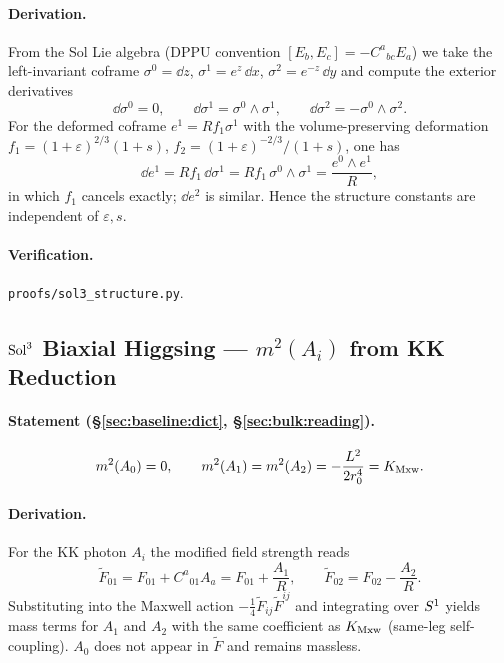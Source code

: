 \paragraph{Derivation.}
From the Sol Lie algebra (DPPU convention $[E_b, E_c] = -C^a{}_{bc} E_a$) we
take the left-invariant coframe
$\sigma^0 = \dd z$, $\sigma^1 = e^z\,\dd x$, $\sigma^2 = e^{-z}\,\dd y$ and
compute the exterior derivatives
\begin{equation}
  \dd\sigma^0 = 0, \qquad
  \dd\sigma^1 = \sigma^0\wedge\sigma^1, \qquad
  \dd\sigma^2 = -\sigma^0\wedge\sigma^2.
\end{equation}
For the deformed coframe $e^1 = R f_1\sigma^1$ with the volume-preserving
deformation $f_1 = (1+\varepsilon)^{2/3}(1+s)$,
$f_2 = (1+\varepsilon)^{-2/3}/(1+s)$, one has
\begin{equation}
  \dd e^1 = R f_1\,\dd\sigma^1
         = R f_1\,\sigma^0\wedge\sigma^1
         = \frac{e^0\wedge e^1}{R},
\end{equation}
in which $f_1$ cancels exactly; $\dd e^2$ is similar.  Hence the structure
constants are independent of $\varepsilon, s$.

\paragraph{Verification.}
\texttt{proofs/sol3\_structure.py}.

\subsection{$\mathrm{Sol}^3$ Biaxial Higgsing --- $m^2(A_i)$ from KK Reduction}
\label{app:E:E2}

\paragraph{Statement (\S\ref{sec:baseline:dict}, \S\ref{sec:bulk:reading}).}
\begin{equation}
  m^2(A_0) = 0, \qquad m^2(A_1) = m^2(A_2) = -\frac{L^2}{2 r_0^4} = K_{\mathrm{Mxw}}.
\end{equation}

\paragraph{Derivation.}
For the KK photon $A_i$ the modified field strength reads
\begin{equation}
  \tilde{F}_{01} = F_{01} + C^a{}_{01}A_a = F_{01} + \frac{A_1}{R},
  \qquad
  \tilde{F}_{02} = F_{02} - \frac{A_2}{R}.
\end{equation}
Substituting into the Maxwell action $-\tfrac{1}{4}\tilde{F}_{ij}\tilde{F}^{ij}$
and integrating over $S^1$ yields mass terms for $A_1$ and $A_2$ with the
same coefficient as $K_{\mathrm{Mxw}}$ (same-leg self-coupling).  $A_0$ does not appear
in $\tilde{F}$ and remains massless.


